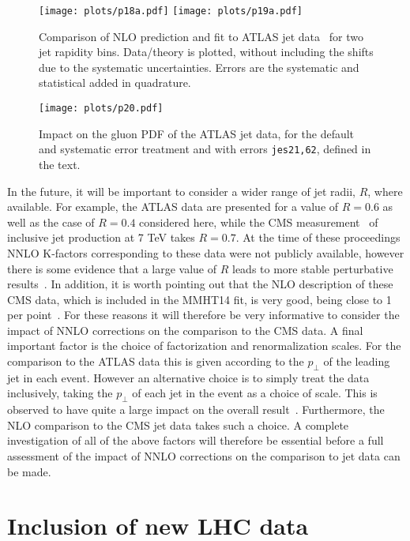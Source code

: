 \documentclass{appolb}
\begin{document}
\begin{figure}[htb]
\centerline{%
\texttt{[image: plots/p18a.pdf]}
\texttt{[image: plots/p19a.pdf]}}
\caption{Comparison of NLO prediction and fit to ATLAS jet data~\cite{Aad:2014vwa} for two jet rapidity bins. Data/theory is plotted, without including the shifts due to the systematic uncertainties. Errors are the systematic and statistical added in quadrature.}
\label{fig:jet3}
\end{figure}

\begin{figure}[htb]
\centerline{%
\texttt{[image: plots/p20.pdf]}}
\caption{Impact on the gluon PDF of the ATLAS jet data, for the default and systematic error treatment and with errors \texttt{jes21,62}, defined in the text.}
\label{fig:gluon}
\end{figure}

In the future, it will be important to consider a wider range of jet radii, $R$, where available. For example, the ATLAS data are presented for a value of $R=0.6$ as well as the case of $R=0.4$ considered here, while the CMS measurement~\cite{Chatrchyan:2012bja} of inclusive jet production at 7 TeV takes $R=0.7$. At the time of these proceedings NNLO K-factors corresponding to these data were not publicly available, however there is some evidence that a large value of $R$ leads to more stable perturbative results~\cite{Currietalk}. In addition, it is worth pointing out that the NLO description of these CMS data, which is included in the MMHT14 fit, is very good, being close to 1 per point~\cite{Harland-Lang:2014zoa}. For these reasons it will therefore be very informative to consider the impact of NNLO corrections on the comparison to the CMS data. A final important factor is the choice of factorization and renormalization scales. For the comparison to the ATLAS data this is given according to the $p_\perp$ of the leading jet in each event. However an alternative choice is to simply treat the data inclusively, taking the $p_\perp$ of each jet in the event as a choice of scale. This is observed to have quite a large impact on the overall result~\cite{Currietalk}. Furthermore, the NLO comparison to the CMS jet data takes such a choice. A complete investigation of all of the above factors will therefore be essential before a full assessment of the impact of NNLO corrections on the comparison to jet data can be made.

\section{Inclusion of new LHC data}
\end{document}
